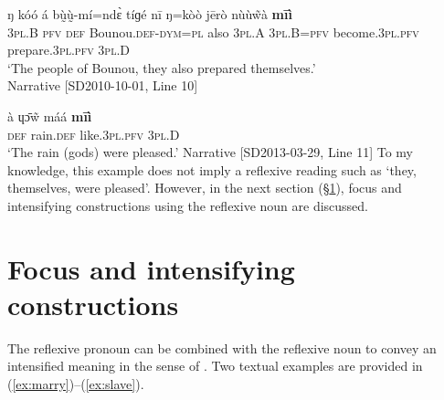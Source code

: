 \documentclass[output=paper]{langscibook}
\begin{document}
\gll ŋ kóó á bṵ̀ṵ̀-mí=ndɛ̀ tíɡé nī ŋ=kòò jērò nùùw̃à \textbf{mīì} \\
3\textsc{pl}.B \textsc{pfv} \textsc{def} Bounou.\textsc{def}-\textsc{dym}=\textsc{pl} also 3\textsc{pl}.A 3\textsc{pl}.B=\textsc{pfv} become.3\textsc{pl}.\textsc{pfv} prepare.3\textsc{pl}.\textsc{pfv} 3\textsc{pl}.D \\
\glt `The people of Bounou, they also prepared themselves.' \\
Narrative [SD2010-10-01, Line 10]
\z
\ea \label{ex:rain}

\gll à ɥɔ̄w̃ máá \textbf{mīì} \\
\textsc{def} rain.\textsc{def} like.3\textsc{pl}.\textsc{pfv} 3\textsc{pl}.D  \\
\glt `The rain (gods) were pleased.' Narrative [SD2013-03-29, Line 11]
\z
To my knowledge, this example does not imply a reflexive reading such as `they, themselves, were pleased'. However, in the next section (\S \ref{sec:foc}), focus and intensifying constructions using the reflexive noun are discussed.%

\section{Focus and intensifying constructions}
\label{sec:foc}
The reflexive pronoun can be combined with the reflexive noun to convey an intensified meaning in the sense of \cite{KoenigSiemund2000}. Two textual examples are provided in  (\ref{ex:marry})--(\ref{ex:slave}).
\ea \label{ex:marry}
\end{document}
